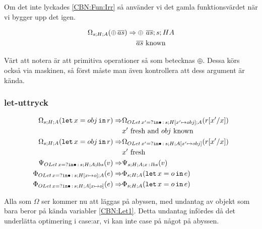 \documentclass[../Optimise]{subfiles}
\begin{document}
Om det inte lyckades \eqref{CBN:Fun:Irr} så använder vi det gamla funktionsvärdet
när vi bygger upp det igen.

\begin{align}
\Omega_{s;H;A}(\oplus\, \overline{as})  \Rightarrow & \oplus\, \overline{as};s;HA \\
 & \overline{as} \text{ known} \nonumber
\end{align}

Värt att notera är att primitiva operationer så som \miniCode{+\# *\# ==\#} betecknas $\oplus$. 
Dessa körs också via maskinen, så först måste man även kontrollera att dess argument
är kända.

\subsubsection{let-uttryck}
\begin{align}
\label{CBN:Let1} \Omega_{s;H;A}(\mathtt{let}\,x=obj\,\mathtt{in}\,r) \Rightarrow & \Omega_{OLet\,x'=?\mathtt{ in }\bullet\,:\,s;H[x'\mapsto obj];A}(r[x'/x])\\
   & x'\mbox{ fresh and } obj \text{ known}\nonumber \\
\label{CBN:Let2} \Omega_{s;H;A}(\mathtt{let}\,x=obj\,\mathtt{in}\,r) \Rightarrow & \Omega_{OLet\,x'=?\mathtt{ in }\bullet\,:\,s;H;A[x'\mapsto obj]}(r[x'/x])\\
   & x'\mbox{ fresh} \nonumber \\
\label{CBN:Let3} \Psi_{OLet\,x=?\mathtt{ in }\bullet\,:\,s;H;A;lbs}(v) \Rightarrow & \Psi_{s;H;A;x\,:\, lbs}(v) \\
\label{CBN:Let4} \Phi_{OLet\,x=?\mathtt{ in }\bullet\,:\,s;H[x\mapsto o];A}(e) \Rightarrow & \Phi_{s;H;A}(\mathtt{let}\,x=o\,\mathtt{in}\,e) \\
\label{CBN:Let5} \Phi_{OLet\,x=?\mathtt{ in }\bullet\,:\,s;H;A[x\mapsto o]}(e) \Rightarrow & \Phi_{s;H;A}(\mathtt{let}\,x=o\,\mathtt{in}\,e)
\end{align}



Alla  som $\Omega$ ser kommer nu att läggas på abyssen, med undantag av objekt som bara beror på kända variabler \eqref{CBN:Let1}. Detta undantag infördes då det underlätta optimering i case:ar, vi kan inte case på något på abyssen.
\end{document}
